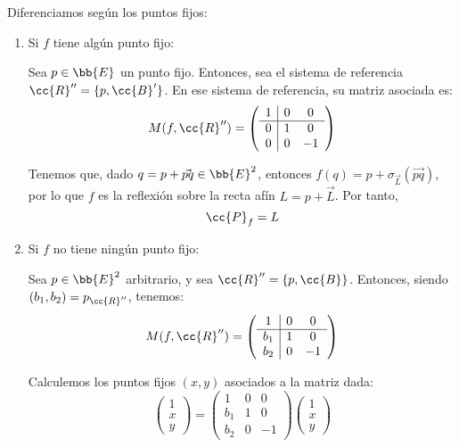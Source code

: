 Diferenciamos según los puntos fijos:
\begin{enumerate}
    \item Si $f$ tiene algún punto fijo:

    Sea $p\in \bb{E}$ un punto fijo. Entonces, sea el sistema de referencia $\cc{R}''= \{p, \cc{B}'\}$. En ese sistema de referencia, su matriz asociada es:
    \begin{equation*}
        M(f,\cc{R}'') = \left(\begin{array}{c|cc}
            1 & 0 & 0 \\ \hline
            0 & 1 & 0 \\ 
            0 & 0 & -1
        \end{array}\right)
    \end{equation*}

    Tenemos que, dado $q=p+\vec{pq}\in \bb{E}^2$, entonces $f(q)=p+\sigma_{\vec{L}}(\vec{pq})$, por lo que $f$ es la reflexión sobre la recta afín $L=p+\vec{L}$. Por tanto,
    \begin{equation*}
        \cc{P}_f = L
    \end{equation*}

    \item Si $f$ no tiene ningún punto fijo:

    Sea $p\in \bb{E}^2$ arbitrario, y sea $\cc{R}''=\{p, \cc{B}\}$. Entonces, siendo $(b_1,b_2)=p_{\cc{R}''}$, tenemos:
    \begin{equation*}
        M(f,\cc{R}'') = \left(\begin{array}{c|cc}
            1 & 0 & 0 \\ \hline
            b_1 & 1 & 0 \\ 
            b_2 & 0 & -1
        \end{array}\right)
    \end{equation*}

    Calculemos los puntos fijos $(x,y)$ asociados a la matriz dada:
    \begin{equation*}
        \left(\begin{array}{c}
            1 \\ \hline x \\ y
        \end{array}\right)
        = \left(\begin{array}{c|cc}
            1 & 0 & 0 \\ \hline
            b_1 & 1 & 0 \\ 
            b_2 & 0 & -1
        \end{array}\right)
        \left(\begin{array}{c}
            1 \\ \hline x \\ y
        \end{array}\right)
    \end{equation*}


\end{enumerate}
